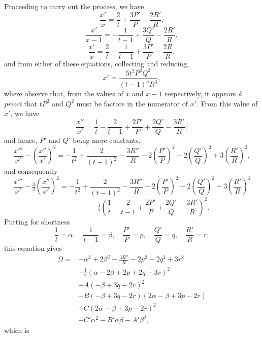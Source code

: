 \documentclass[11pt,a4paper]{article}
\begin{document}
Proceeding to carry out the process, we have
\[
\frac{x'}{x} = \frac{2}{t} + \frac{3 P'}{P} - \frac{2 R'}{R},
\]
\[
\frac{x'}{x - 1} = - \frac{1}{t - 1} + \frac{3 Q'}{Q} - \frac{2 R'}{R},
\]
\[
\frac{x'}{x} = \frac{2}{t} - \frac{1}{t - 1} + \frac{3 P'}{P} - \frac{2 R}{R},
\]
and from either of these equations, collecting and reducing,
\[
x' = \frac{5 t^2 P^2 Q^2}{(t - 1)^3 R^3},
\]
where observe that, from the values of $x$ and $x - 1$ respectively, it appears \emph{à priori} that $t P^2$ and $Q^2$ must be factors in the numerator of $x'$. From this value of $x'$, we have
\[
\frac{x''}{x'} = \frac{1}{t} - \frac{2}{t - 1} + \frac{2 P'}{P} + \frac{2 Q'}{Q} - \frac{3 R'}{R};
\]
and hence, $P'$ and $Q'$ being mere constants,
\[
\frac{x'''}{x'} - \!\left(\frac{x''}{x'}\right)^2 = - \frac{1}{t^2} + \frac{2}{(t - 1)^2} - \frac{3 R''}{R} - 2\!\left(\frac{P'}{P}\right)^2 - 2\!\left(\frac{Q'}{Q}\right)^2 + 3\!\left(\frac{R'}{R}\right)^2,
\]
and consequently
\[
\frac{x'''}{x'} - \tfrac{3}{2}\!\left(\frac{x''}{x'}\right)^2 = - \frac{1}{t^2} + \frac{2}{(t - 1)^2} - \frac{3 R''}{R} - 2\!\left(\frac{P'}{P}\right)^2 - 2\!\left(\frac{Q'}{Q}\right)^2 + 3\!\left(\frac{R'}{R}\right)^2
\]
\[
\hspace{2cm} - \tfrac{1}{2}\!\left(\frac{1}{t} - \frac{2}{t - 1} + \frac{2 P'}{P} + \frac{2 Q'}{Q} - \frac{3 R'}{R}\right)^2.
\]
Putting for shortness
\[
\frac{1}{t} = \alpha,\quad \frac{1}{t - 1} = \beta,\quad \frac{P'}{P} = p,\quad \frac{Q'}{Q} = q,\quad \frac{R'}{R} = r,
\]
this equation gives
\begin{align*}
\Omega = & - \alpha^2 + 2 \beta^2 - \frac{3 R''}{R} - 2 p^2 - 2 q^2 + 3 r^2\\
& - \tfrac{1}{2}(\alpha - 2 \beta + 2 p + 2 q - 3 r)^2\\
& + A(- \beta + 3 q - 2 r)^2\\
& + B(- \beta + 3 q - 2 r)(2 \alpha - \beta + 3 p - 2 r)\\
& + C(2 \alpha - \beta + 3 p - 2 r)^2\\
& - C' \alpha^2 - B' \alpha \beta - A' \beta^2,
\end{align*}
which is
\end{document}
